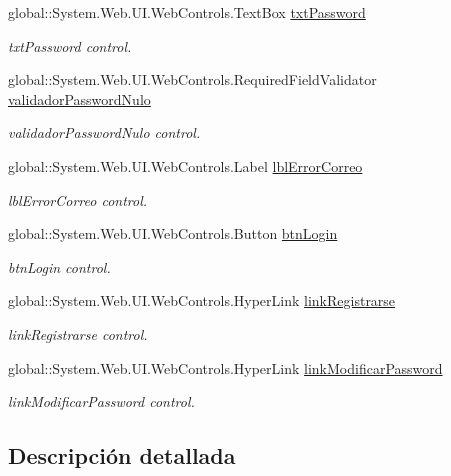 \begin{DoxyCompactItemize}
global\+::\+System.\+Web.\+U\+I.\+Web\+Controls.\+Text\+Box \mbox{\hyperlink{classwebprueba_1_1_inicio_ae729ab398507e57d56602498e15acc69}{txt\+Password}}
\begin{DoxyCompactList}\small\item\em txt\+Password control. \end{DoxyCompactList}\item 
global\+::\+System.\+Web.\+U\+I.\+Web\+Controls.\+Required\+Field\+Validator \mbox{\hyperlink{classwebprueba_1_1_inicio_aab7a4ebb559f60eaf4e9964411639d8c}{validador\+Password\+Nulo}}
\begin{DoxyCompactList}\small\item\em validador\+Password\+Nulo control. \end{DoxyCompactList}\item 
global\+::\+System.\+Web.\+U\+I.\+Web\+Controls.\+Label \mbox{\hyperlink{classwebprueba_1_1_inicio_af0c102659b4bcc75bd2c07268c58063a}{lbl\+Error\+Correo}}
\begin{DoxyCompactList}\small\item\em lbl\+Error\+Correo control. \end{DoxyCompactList}\item 
global\+::\+System.\+Web.\+U\+I.\+Web\+Controls.\+Button \mbox{\hyperlink{classwebprueba_1_1_inicio_a49b6bf4ee7fb44110630737302b382b2}{btn\+Login}}
\begin{DoxyCompactList}\small\item\em btn\+Login control. \end{DoxyCompactList}\item 
global\+::\+System.\+Web.\+U\+I.\+Web\+Controls.\+Hyper\+Link \mbox{\hyperlink{classwebprueba_1_1_inicio_a057d09569d2ffa589dac3b0520ba7ec1}{link\+Registrarse}}
\begin{DoxyCompactList}\small\item\em link\+Registrarse control. \end{DoxyCompactList}\item 
global\+::\+System.\+Web.\+U\+I.\+Web\+Controls.\+Hyper\+Link \mbox{\hyperlink{classwebprueba_1_1_inicio_aaed3ea21ca405b6d99aa55b3153f1f51}{link\+Modificar\+Password}}
\begin{DoxyCompactList}\small\item\em link\+Modificar\+Password control. \end{DoxyCompactList}\end{DoxyCompactItemize}


\subsection{Descripción detallada}


